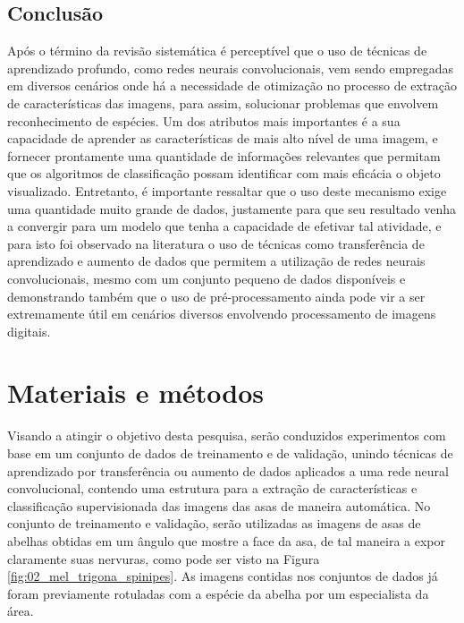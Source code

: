 \documentclass[
	12pt,				%
	oneside,			%
	a4paper,			%
	english,			%
	brazil				%
	]{abntex2ppgsi}
\begin{document}
\section{Conclusão}
Após o término da revisão sistemática é perceptível que o uso de técnicas de aprendizado profundo, como redes neurais convolucionais, vem sendo empregadas em diversos cenários onde há a necessidade de otimização no processo de extração de características das imagens, para assim, solucionar problemas que envolvem reconhecimento de espécies. Um dos atributos mais importantes é a sua capacidade de aprender as características de mais alto nível de uma imagem, e fornecer prontamente uma quantidade de informações relevantes que permitam que os algoritmos de classificação possam identificar com mais eficácia o objeto visualizado. Entretanto, é importante ressaltar que o uso deste mecanismo exige uma quantidade muito grande de dados, justamente para que seu resultado venha a convergir para um modelo que tenha a capacidade de efetivar tal atividade, e para isto foi observado na literatura o uso de técnicas como transferência de aprendizado e aumento de dados que permitem a utilização de redes neurais convolucionais, mesmo com um conjunto pequeno de dados disponíveis e demonstrando também que o uso de pré-processamento ainda pode vir a ser extremamente útil em cenários diversos envolvendo processamento de imagens digitais.

\chapter{Materiais e métodos}
Visando a atingir o objetivo desta pesquisa, serão conduzidos experimentos com base em um conjunto de dados de treinamento e de validação, unindo técnicas de aprendizado por transferência ou aumento de dados aplicados a uma rede neural convolucional, contendo uma estrutura para a extração de características e classificação supervisionada das imagens das asas de maneira automática.
No conjunto de treinamento e validação, serão utilizadas as imagens de asas de abelhas obtidas em um ângulo que mostre a face da asa, de tal maneira a expor claramente suas nervuras, como pode ser visto na Figura \ref{fig:02_mel_trigona_spinipes}. As imagens contidas nos conjuntos de dados já foram previamente rotuladas com a espécie da abelha por um especialista da área.
\end{document}
